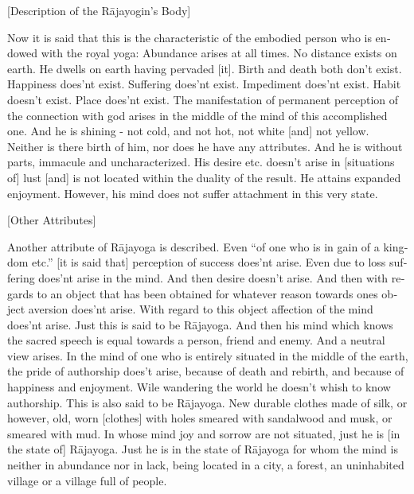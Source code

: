 \begin{otherlanguage}{english}
\begin{tlate}
  \end{tlate}
    \bigskip
    \centerline{\textrm{\small{[Description of the Rājayogin's Body]}}}
    \bigskip
      \begin{tlate}
Now it is said that this is the characteristic of the embodied person who is endowed with the royal yoga: Abundance arises at all times. No distance exists on earth. He dwells on earth having pervaded [it]. Birth and death both don't exist. Happiness does'nt exist. Suffering does'nt exist. Impediment does'nt exist. Habit doesn't exist. Place does'nt exist. The manifestation of permanent perception of the connection with god arises in the middle of the mind of this accomplished one. And he is shining - not cold, and not hot, not white [and] not yellow. Neither is there birth of him, nor does he have any attributes. And he is without parts, immacule and uncharacterized. His desire etc. doesn't arise in [situations of] lust [and] is not located within the duality of the result. He attains expanded enjoyment. However, his mind does not suffer attachment in this very state.     
    \end{tlate}
    \bigskip
    \centerline{\textrm{\small{[Other Attributes]}}}
    \bigskip
  \begin{tlate}
    Another attribute of Rājayoga is described. Even ``of one who is in gain of a kingdom etc.'' [it is said that] perception of success does'nt arise. Even due to loss suffering does'nt arise in the mind. And then desire doesn't arise. And then with regards to an object that has been obtained for whatever reason towards ones object aversion does'nt arise. With regard to this object affection of the mind does'nt arise. Just this is said to be Rājayoga. And then his mind which knows the sacred speech is equal towards a person, friend and enemy. And a neutral view arises. In the mind of one who is entirely situated in the middle of the earth, the pride of authorship does't arise, because of death and rebirth, and because of happiness and enjoyment. Wile wandering the world he doesn't whish to know authorship. This is also said to be Rājayoga. New durable clothes made of silk, or however, old, worn [clothes] with holes smeared with sandalwood and musk, or smeared with mud. In whose mind joy and sorrow are not situated, just he is [in the state of] Rājayoga. Just he is in the state of Rājayoga for whom the mind is neither in abundance nor in lack, being located in a city, a forest, an uninhabited village or a village full of people.    

\end{tlate}
\end{otherlanguage}

